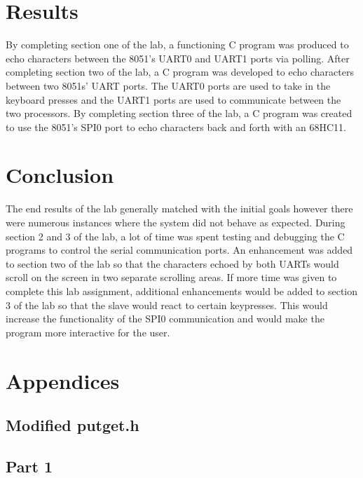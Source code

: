 \documentclass[12pt]{article}
\begin{document}
\section{Results}

By completing section one of the lab, a functioning C program was produced to echo characters between the 8051’s UART0 and UART1 ports via polling. After completing section two of the lab, a C program was developed to echo characters between two 8051s’ UART ports. The UART0 ports are used to take in the keyboard presses and the UART1 ports are used to communicate between the two processors. By completing section three of the lab, a C program was created  to use the 8051’s SPI0 port to echo characters back and forth with an 68HC11. 


\section{Conclusion}

The end results of the lab generally matched with the initial goals however there were numerous instances where the system did not behave as expected. During section 2 and 3 of the lab, a lot of time was spent testing and debugging the C programs to control the serial communication ports. An enhancement was added to section two of the lab so that the characters echoed by both UARTs would scroll on the screen in two separate scrolling areas. 
If more time was given to complete this lab assignment, additional enhancements would be added to section 3 of the lab so that the slave would react to certain keypresses. This would increase the functionality of the SPI0 communication and would make the program more interactive for the user. 




\pagebreak
\section{Appendices}
\subsection{Modified putget.h}
	
\subsection{Part 1}
\end{document}
